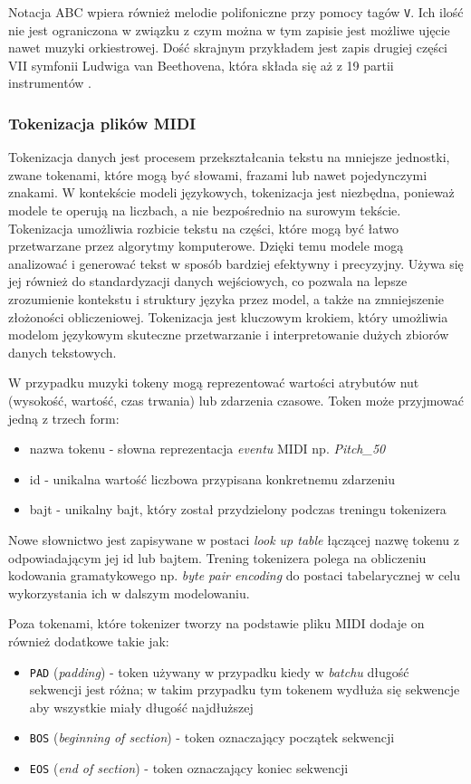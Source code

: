 \documentclass[data-science]{agh-wi} %
\begin{document}
Notacja ABC wpiera również melodie polifoniczne przy pomocy tagów \texttt{V}. Ich ilość nie jest ograniczona w związku z czym można w tym zapisie jest możliwe ujęcie nawet muzyki orkiestrowej. Dość skrajnym przykładem jest zapis drugiej części VII symfonii Ludwiga van Beethovena, która składa się aż z 19 partii instrumentów \cite{beethoven}.

\subsubsection*{Tokenizacja plików MIDI}\label{sec:REMI}
Tokenizacja danych jest procesem przekształcania tekstu na mniejsze jednostki, zwane tokenami, które mogą być słowami, frazami lub nawet pojedynczymi znakami. W kontekście modeli językowych, tokenizacja jest niezbędna, ponieważ modele te operują na liczbach, a nie bezpośrednio na surowym tekście. Tokenizacja umożliwia rozbicie tekstu na części, które mogą być łatwo przetwarzane przez algorytmy komputerowe. Dzięki temu modele mogą analizować i generować tekst w sposób bardziej efektywny i precyzyjny. Używa się jej również do standardyzacji danych wejściowych, co pozwala na lepsze zrozumienie kontekstu i struktury języka przez model, a także na zmniejszenie złożoności obliczeniowej. Tokenizacja jest kluczowym krokiem, który umożliwia modelom językowym skuteczne przetwarzanie i interpretowanie dużych zbiorów danych tekstowych.

W przypadku muzyki tokeny mogą reprezentować wartości atrybutów nut (wysokość, wartość, czas trwania) lub zdarzenia czasowe. Token może przyjmować jedną z trzech form:
\begin{itemize}
    \item nazwa tokenu - słowna reprezentacja \textit{eventu} MIDI np. \textit{Pitch\_50}
    \item id - unikalna wartość liczbowa przypisana konkretnemu zdarzeniu
    \item bajt - unikalny bajt, który został przydzielony podczas treningu tokenizera
\end{itemize}

Nowe słownictwo jest zapisywane w postaci \textit{look up table} łączącej nazwę tokenu z odpowiadającym jej id lub bajtem. Trening tokenizera polega na obliczeniu kodowania gramatykowego np. \textit{byte pair encoding} do postaci tabelarycznej w celu wykorzystania ich w dalszym modelowaniu.

Poza tokenami, które tokenizer tworzy na podstawie pliku MIDI dodaje on również dodatkowe takie jak:
\begin{itemize}
    \item \texttt{PAD} (\textit{padding}) - token używany w przypadku kiedy w \textit{batchu} długość sekwencji jest różna; w takim przypadku tym tokenem wydłuża się sekwencje aby wszystkie miały długość najdłuższej
    \item \texttt{BOS} (\textit{beginning of section}) - token oznaczający początek sekwencji
    \item \texttt{EOS} (\textit{end of section}) - token oznaczający koniec sekwencji
\end{itemize}
\end{document}
